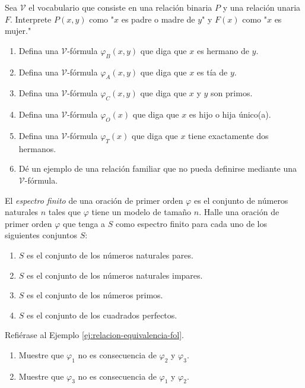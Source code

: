 \documentclass[12pt,a4paper]{book}
\newcommand{\comillas}[1]{"#1"}
\newcommand{\VV}{\mathcal{V}}
\begin{document}
    \begin{ejercicio}
        Sea $\VV$ el vocabulario que consiste en una relación binaria $P$ y una relación unaria $F$. Interprete $P(x,y)$
        como \comillas{$x$ es padre o madre de $y$} y $F(x)$ como \comillas{$x$ es mujer.}
        \begin{enumerate}[label=(\alph*)]
            \item Defina una $\VV$-fórmula $\varphi_{B}(x,y)$ que diga que $x$ es hermano de $y$.
            \item Defina una $\VV$-fórmula $\varphi_{A}(x,y)$ que diga que $x$ es tía de $y$.
            \item Defina una $\VV$-fórmula $\varphi_{C}(x,y)$ que diga que $x$ y $y$ son primos.
            \item Defina una $\VV$-fórmula $\varphi_{O}(x)$ que diga que $x$ es hijo o hija único(a).
            \item Defina una $\VV$-fórmula $\varphi_{T}(x)$ que diga que $x$ tiene exactamente dos hermanos.
            \item Dé un ejemplo de una relación familiar que no pueda definirse mediante una $\VV$-fórmula.
        \end{enumerate}
    \end{ejercicio}

    \begin{ejercicio}
        El \textit{espectro finito} de una oración de primer orden $\varphi$ es el conjunto de números naturales $n$
        tales que $\varphi$ tiene un modelo de tamaño $n$. Halle una oración de primer orden $\varphi$ que tenga a $S$
        como espectro finito para cada uno de los siguientes conjuntos $S$:
        \begin{enumerate}[label=(\alph*)]
            \item $S$ es el conjunto de los números naturales pares.
            \item $S$ es el conjunto de los números naturales impares.
            \item $S$ es el conjunto de los números primos.
            \item $S$ es el conjunto de los cuadrados perfectos.
        \end{enumerate}
    \end{ejercicio}

    \begin{ejercicio}
        Refiérase al Ejemplo \ref{ej:relacion-equivalencia-fol}.
        \begin{enumerate}[label=(\alph*)]
            \item Muestre que $\varphi_{1}$ no es consecuencia de $\varphi_{2}$ y $\varphi_{3}$.
            \item Muestre que $\varphi_{3}$ no es consecuencia de $\varphi_{1}$ y $\varphi_{2}$.
        \end{enumerate}
    \end{ejercicio}
\end{document}
